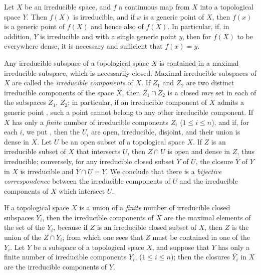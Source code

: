 \begin{env}[2.1.5]
\label{0.2.1.5}
Let $X$ be an irreducible space, and $f$ a continuous map from $X$ into a topological space $Y$.
Then $f(X)$ is irreducible, and if $x$ is a generic point of $X$, then $f(x)$ is a generic point of $f(X)$ and hence also of $\overline{f(X)}$. 
In particular, if, in addition, $Y$ is irreducible and with a single generic point $y$, then for $f(X)$ to be everywhere dense, it is necessary and sufficient that $f(x)=y$.
\end{env}

\begin{env}[2.1.6]
\label{0.2.1.6}
Any irreducible subspace of a topological space $X$ is contained in a maximal irreducible subspace, which is necessarily closed.
Maximal irreducible subspaces of $X$ are called the \emph{irreducible components} of $X$.
If $Z_1$ and $Z_2$ are two distinct irreducible components of the space $X$, then $Z_1\cap Z_2$ is a closed \emph{rare} set in each of the subspaces $Z_1$, $Z_2$; in particular, if an irreducible component of $X$ admits a generic point , such a point cannot belong to any other irreducible component.
If $X$ has only a \emph{finite} number of irreducible components $Z_i$ ($1\leq i\leq n$), and if, for each $i$, we put
, then the $U_i$ are open, irreducible, disjoint, and their union is dense in $X$.
Let $U$ be an open subset of a topological space $X$.
If $Z$ is an irreducible subset of $X$ that intersects $U$, then $Z\cap U$ is open and dense in $Z$, thus irreducible; conversely, for any irreducible closed subset $Y$ of $U$, the closure $\overline{Y}$ of $Y$ in $X$ is irreducible and $\overline{Y}\cap U=Y$.
We conclude that there is a \emph{bijective correspondence} between the irreducible components of $U$ and the irreducible components of $X$ which intersect $U$.
\end{env}

\begin{env}[2.1.7]
\label{0.2.1.7}
If a topological space $X$ is a union of a \emph{finite} number of irreducible closed subspaces $Y_i$, then the irreducible components of $X$ are the maximal elements of the set of the $Y_i$, because if $Z$ is an irreducible closed subset of $X$, then $Z$ is the union of the $Z\cap Y_i$, from which one sees that $Z$ must be contained in one of the $Y_i$.
Let $Y$ be a subspace of a topological space $X$, and suppose that $Y$ has only a finite number of irreducible components $Y_i$, ($1\leq i\leq n$); then the closures $\overline{Y_i}$ in $X$ are the irreducible components of $Y$.
\end{env}

